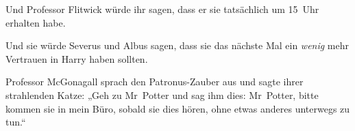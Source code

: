 Und Professor Flitwick würde ihr sagen, dass er sie tatsächlich um 15~Uhr erhalten habe.

Und sie würde Severus und Albus sagen, dass sie das nächste Mal ein \emph{wenig} mehr Vertrauen in Harry haben sollten.

Professor McGonagall sprach den Patronus-Zauber aus und sagte ihrer strahlenden Katze:
„Geh zu Mr~Potter und sag ihm dies: Mr~Potter, bitte kommen sie in mein Büro, sobald sie dies hören, ohne etwas anderes unterwegs zu tun.“

